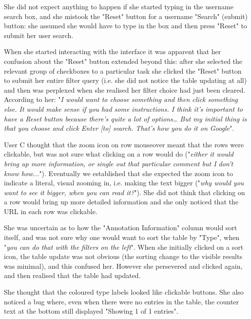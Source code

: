 She did not expect anything to happen if she started typing in the username search box, and she mistook the "Reset" button for a username "Search" (submit) button: she assumed she would have to type in the box and then press "Reset" to submit her user search. 

When she started interacting with the interface it was apparent that her confusion about the "Reset" button extended beyond this: after she selected the relevant group of checkboxes to a particular task she clicked the "Reset" button to submit her entire filter query (i.e. she did not notice the table updating at all) and then was perplexed when she realised her filter choice had just been cleared. According to her: "\textit{I would want to choose something and then click something else.  It would make sense if you had some instructions. I think it's important to have a Reset button because there's quite a lot of options… But my initial thing is that you choose and click Enter [to] search. That's how you do it on Google}". 

User C thought that the zoom icon on row mouseover meant that the rows were clickable, but was not sure what clicking on a row would do ("\textit{either it would bring up more information, or single out that particular comment but I don't know how...}"). Eventually we established that she expected the zoom icon to indicate a literal, visual zooming in, i.e. making the text bigger ("\textit{why would you want to see it bigger, when you can read it?}"). She did not think that clicking on a row would bring up more detailed information and she only noticed that the URL in each row was clickable. 

She was uncertain as to how the "Annotation Information" column would sort itself, and was not sure why one would want to sort the table by "Type", when "\textit{you can do that with the filters on the left}". When she initially clicked on a sort icon, the table update was not obvious (the sorting change to the visible results was minimal), and this confused her. However she persevered and clicked again, and then realised that the table had updated. 

She thought that the coloured type labels looked like clickable buttons. She also noticed a bug where, even when there were no entries in the table, the counter text at the bottom still displayed "Showing 1 of 1 entries".


